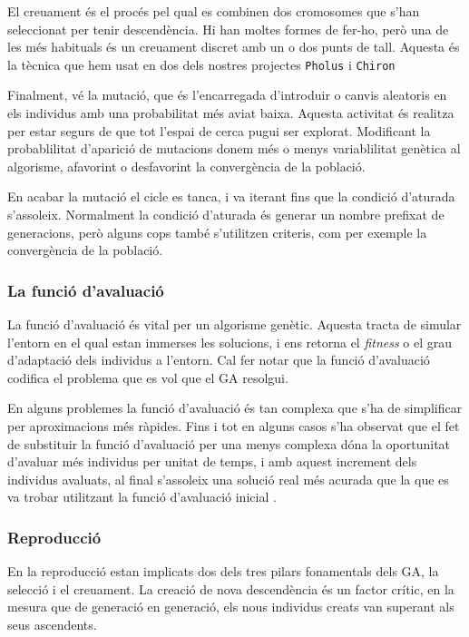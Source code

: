El creuament és el procés pel qual es combinen dos cromosomes que s'han
seleccionat per tenir descendència. Hi han moltes formes de fer-ho, però una de
les més habituals és un creuament discret amb un o dos punts de tall.  Aquesta
és la tècnica que hem usat en dos dels nostres projectes \texttt{Pholus} i
\texttt{Chiron}  %

Finalment, vé la mutació, que és l'encarregada d'introduir o canvis aleatoris en
els individus amb una probabilitat més aviat baixa. Aquesta activitat és
realitza per estar segurs de que tot l'espai de cerca pugui ser explorat.
Modificant la probablilitat d'aparició de mutacions donem més o menys
variablilitat genètica al algorisme, afavorint o desfavorint la convergència de
la població.

En acabar la mutació el cicle es tanca, i va iterant fins que la condició
d'aturada s'assoleix. Normalment la condició d'aturada és generar un nombre
prefixat de generacions, però alguns cops també s'utilitzen criteris, com per
exemple la convergència de la població.

\subsubsection{La funció d'avaluació\label{subsec:avaluacio}} La funció
d'avaluació és vital per un algorisme genètic. Aquesta tracta de simular
l'entorn en el qual estan immerses les solucions, i ens retorna el
\emph{fitness} o el grau d'adaptació dels individus a l'entorn. Cal fer notar
que la funció d'avaluació codifica el problema que es vol que el GA resolgui.

En alguns problemes la funció d'avaluació és tan complexa que s'ha de
simplificar per aproximacions més ràpides. Fins i tot en alguns casos s'ha
observat que el fet de substituir la funció d'avaluació per una menys complexa
dóna la oportunitat d'avaluar més individus per unitat de temps, i amb aquest
increment dels individus avaluats, al final s'assoleix una solució real més
acurada que la que es va trobar utilitzant la funció d'avaluació inicial
\cite{G89}. 

\subsubsection{Reproducció} En la reproducció estan implicats dos dels tres
pilars fonamentals dels GA, la selecció i el creuament. La creació de nova
descendència és un factor crític, en la mesura que de generació en generació,
els nous individus creats van superant als seus ascendents.

